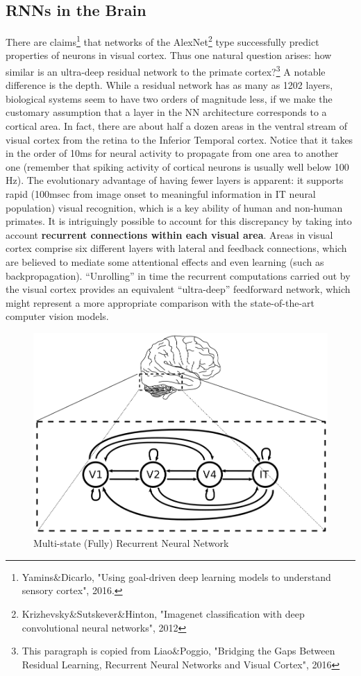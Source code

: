 \documentclass[main]{subfiles}
\begin{document}
\subsection{RNNs in the Brain}
There are claims\footnote{Yamins\&Dicarlo, "Using goal-driven deep learning models to understand sensory cortex", 2016.} that networks of the AlexNet\footnote{Krizhevsky\&Sutskever\&Hinton, "Imagenet classification with deep convolutional neural networks", 2012} type successfully predict properties of neurons in visual cortex. Thus one natural question arises: how similar is an ultra-deep residual network to the primate cortex?\footnote{This paragraph is copied from Liao\&Poggio, "Bridging the Gaps Between Residual Learning, Recurrent Neural Networks and Visual Cortex", 2016} A notable difference is the depth. While a residual network has as many as 1202 layers, biological systems seem to have two orders of magnitude less, if we make the customary assumption that a layer in the NN architecture corresponds to a cortical area. In fact, there are about half a dozen areas in the ventral stream of visual cortex from the retina to the Inferior Temporal cortex. Notice that it takes in the order of 10ms for neural activity to propagate from one area to another one (remember that spiking activity of cortical neurons is usually well below 100 Hz). The evolutionary advantage of having fewer layers is apparent: it supports rapid (100msec from image onset to meaningful information in IT neural population) visual recognition, which is a key ability of human and non-human primates. It is intriguingly possible to account for this discrepancy by taking into account \textbf{recurrent connections within each
visual area}. Areas in visual cortex comprise six different layers with lateral and feedback connections, which are believed to mediate some attentional effects and even learning (such as backpropagation). “Unrolling” in time the recurrent computations carried out by the visual cortex provides an equivalent “ultra-deep”
feedforward network, which might represent a more appropriate comparison with the state-of-the-art computer vision models.
\begin{figure}[H]
    \centering
    \includegraphics[width=0.7\linewidth]{13_LearningInRecurrentNeuronalNetworks/figures/recurrent_v1to4.png}
    \caption{Multi-state (Fully) Recurrent Neural Network}
    \label{fig:lstm_many}
\end{figure}
\end{document}
